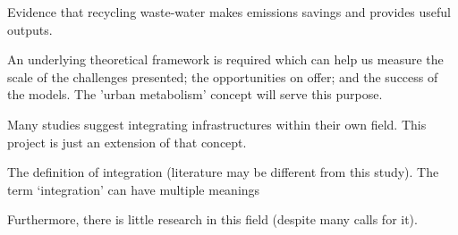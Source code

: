 \citep{Lundin2000} Evidence that recycling waste-water makes emissions savings and provides useful outputs.


An underlying theoretical framework is required which can help us measure the scale of the challenges presented; the opportunities on offer; and the success of the models. The 'urban metabolism' concept will serve this purpose.

Many studies suggest integrating infrastructures within their own field. This project is just an extension of that concept.

The definition of integration (literature may be different from this study).
The term `integration' can have multiple meanings

Furthermore, there is little research in this field (despite many calls for it).  

